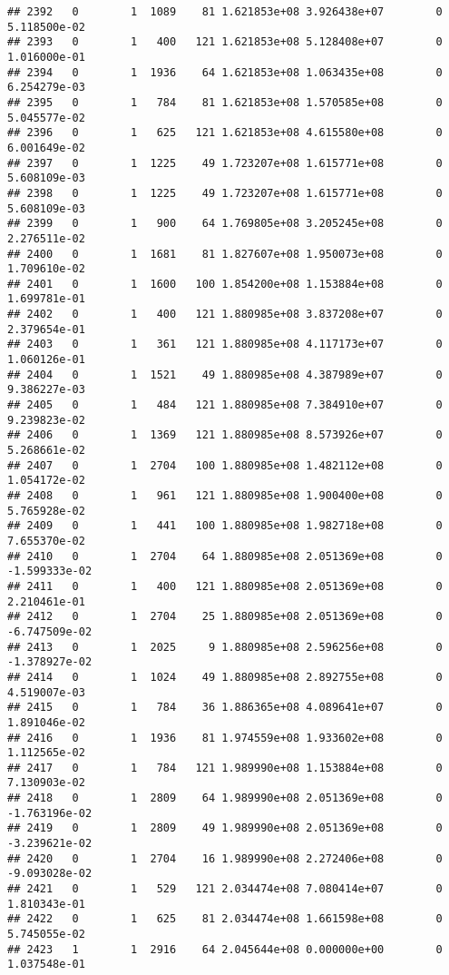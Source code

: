 \documentclass[
]{article}
\begin{document}
\begin{enumerate}
\begin{verbatim}
## 2392   0        1  1089    81 1.621853e+08 3.926438e+07        0  5.118500e-02
## 2393   0        1   400   121 1.621853e+08 5.128408e+07        0  1.016000e-01
## 2394   0        1  1936    64 1.621853e+08 1.063435e+08        0  6.254279e-03
## 2395   0        1   784    81 1.621853e+08 1.570585e+08        0  5.045577e-02
## 2396   0        1   625   121 1.621853e+08 4.615580e+08        0  6.001649e-02
## 2397   0        1  1225    49 1.723207e+08 1.615771e+08        0  5.608109e-03
## 2398   0        1  1225    49 1.723207e+08 1.615771e+08        0  5.608109e-03
## 2399   0        1   900    64 1.769805e+08 3.205245e+08        0  2.276511e-02
## 2400   0        1  1681    81 1.827607e+08 1.950073e+08        0  1.709610e-02
## 2401   0        1  1600   100 1.854200e+08 1.153884e+08        0  1.699781e-01
## 2402   0        1   400   121 1.880985e+08 3.837208e+07        0  2.379654e-01
## 2403   0        1   361   121 1.880985e+08 4.117173e+07        0  1.060126e-01
## 2404   0        1  1521    49 1.880985e+08 4.387989e+07        0  9.386227e-03
## 2405   0        1   484   121 1.880985e+08 7.384910e+07        0  9.239823e-02
## 2406   0        1  1369   121 1.880985e+08 8.573926e+07        0  5.268661e-02
## 2407   0        1  2704   100 1.880985e+08 1.482112e+08        0  1.054172e-02
## 2408   0        1   961   121 1.880985e+08 1.900400e+08        0  5.765928e-02
## 2409   0        1   441   100 1.880985e+08 1.982718e+08        0  7.655370e-02
## 2410   0        1  2704    64 1.880985e+08 2.051369e+08        0 -1.599333e-02
## 2411   0        1   400   121 1.880985e+08 2.051369e+08        0  2.210461e-01
## 2412   0        1  2704    25 1.880985e+08 2.051369e+08        0 -6.747509e-02
## 2413   0        1  2025     9 1.880985e+08 2.596256e+08        0 -1.378927e-02
## 2414   0        1  1024    49 1.880985e+08 2.892755e+08        0  4.519007e-03
## 2415   0        1   784    36 1.886365e+08 4.089641e+07        0  1.891046e-02
## 2416   0        1  1936    81 1.974559e+08 1.933602e+08        0  1.112565e-02
## 2417   0        1   784   121 1.989990e+08 1.153884e+08        0  7.130903e-02
## 2418   0        1  2809    64 1.989990e+08 2.051369e+08        0 -1.763196e-02
## 2419   0        1  2809    49 1.989990e+08 2.051369e+08        0 -3.239621e-02
## 2420   0        1  2704    16 1.989990e+08 2.272406e+08        0 -9.093028e-02
## 2421   0        1   529   121 2.034474e+08 7.080414e+07        0  1.810343e-01
## 2422   0        1   625    81 2.034474e+08 1.661598e+08        0  5.745055e-02
## 2423   1        1  2916    64 2.045644e+08 0.000000e+00        0  1.037548e-01

\end{verbatim}
\end{enumerate}
\end{document}
